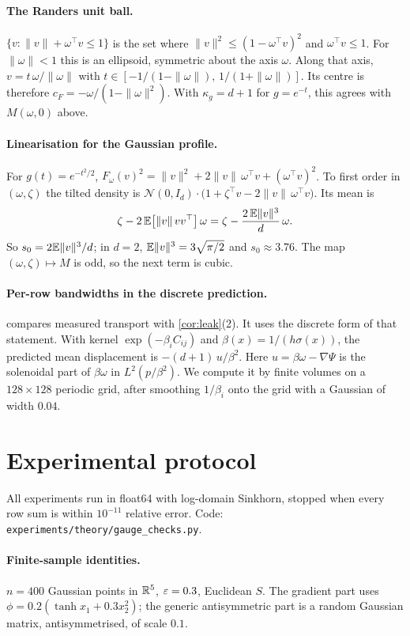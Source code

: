 \paragraph{The Randers unit ball.}
$\{v:\|v\|+\omega^\top v\le1\}$ is the set where $\|v\|^2\le(1-\omega^\top v)^2$
and $\omega^\top v\le1$. For $\|\omega\|<1$ this is an ellipsoid, symmetric
about the axis $\omega$. Along that axis, $v=t\,\omega/\|\omega\|$ with
$t\in[-1/(1-\|\omega\|),\,1/(1+\|\omega\|)]$. Its centre is therefore
$c_F=-\omega/(1-\|\omega\|^2)$. With $\kappa_g=d+1$ for $g=e^{-t}$, this
agrees with $M(\omega,0)$ above.

\paragraph{Linearisation for the Gaussian profile.}
For $g(t)=e^{-t^2/2}$,
$F_\omega(v)^2=\|v\|^2+2\|v\|\,\omega^\top v+(\omega^\top v)^2$. To first
order in $(\omega,\zeta)$ the tilted density is
$\mathcal{N}(0,I_d)\cdot\big(1+\zeta^\top v-2\|v\|\,\omega^\top v\big)$.
Its mean is
\[
  \zeta-2\,\mathbb{E}\big[\|v\|\,vv^\top\big]\,\omega=\zeta-\frac{2\,\mathbb{E}\|v\|^3}{d}\,\omega .
\]
So $s_0=2\mathbb{E}\|v\|^3/d$; in $d=2$, $\mathbb{E}\|v\|^3=3\sqrt{\pi/2}$ and
$s_0\approx3.76$. The map $(\omega,\zeta)\mapsto M$ is odd, so the next
term is cubic.

\paragraph{Per-row bandwidths in the discrete prediction.}
 compares measured transport with \cref{cor:leak}(2). It uses
the discrete form of that statement. With kernel $\exp(-\beta_iC_{ij})$ and
$\beta(x)=1/(h\sigma(x))$, the predicted mean displacement is
$-(d+1)\,u/\beta^2$. Here $u=\beta\omega-\nabla\Psi$ is the solenoidal
part of $\beta\omega$ in $L^2(p/\beta^2)$. We compute it by finite volumes
on a $128\times128$ periodic grid, after smoothing $1/\beta_i$ onto the
grid with a Gaussian of width $0.04$.

\section{Experimental protocol}
\label{app:protocol}

All experiments run in float64 with log-domain Sinkhorn, stopped when every
row sum is within $10^{-11}$ relative error. Code:
\texttt{experiments/theory/gauge\_checks.py}.

\paragraph{Finite-sample identities.}
$n=400$ Gaussian points in $\mathbb{R}^5$, $\varepsilon=0.3$, Euclidean $S$. The gradient
part uses $\phi=0.2(\tanh x_1+0.3x_2^2)$; the generic antisymmetric part is
a random Gaussian matrix, antisymmetrised, of scale $0.1$.

